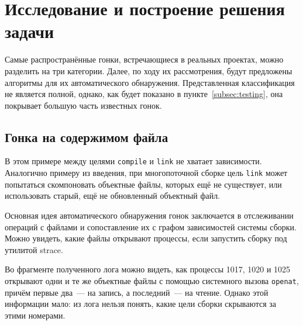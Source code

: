 \section{Исследование и построение решения задачи}
\label{sec:Chapter3} 


Самые распространённые гонки, встречающиеся в реальных проектах, можно разделить на три категории. Далее, по ходу их рассмотрения, будут предложены алгоритмы для их автоматического обнаружения. Представленная классификация не является полной, однако, как будет показано в пункте~\ref{subsec:testing}, она покрывает большую часть известных гонок.

\subsection{Гонка на содержимом файла}
\label{subsec:file-content-races}



В этом примере между целями \texttt{compile} и \texttt{link} не хватает зависимости. Аналогично примеру из введения, при многопоточной сборке цель \texttt{link} может попытаться скомпоновать объектные файлы, которых ещё не существует, или использовать старый, ещё не обновленный объектный файл.

Основная идея автоматического обнаружения гонок заключается в отслеживании операций с файлами и сопоставление их с графом зависимостей системы сборки. Можно увидеть, какие файлы открывают процессы, если запустить сборку под утилитой strace.



Во фрагменте полученного лога можно видеть, как процессы 1017, 1020 и 1025 открывают одни и те же объектные файлы с помощью системного вызова \texttt{openat}, причём первые два~--- на запись, а последний~--- на чтение. Однако этой информации мало: из лога нельзя понять, какие цели сборки скрываются за этими номерами.


